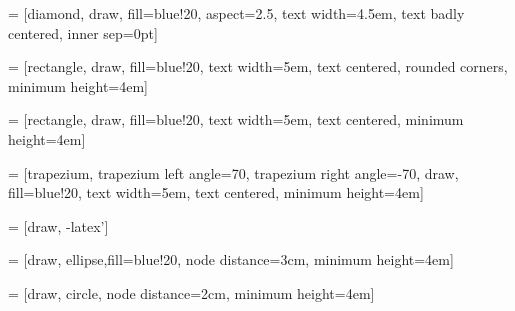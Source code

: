  = [diamond, draw, fill=blue!20, aspect=2.5, 
    text width=4.5em, text badly centered, inner sep=0pt]
    
 = [rectangle, draw, fill=blue!20, text width=5em, text centered, 
    rounded corners, minimum height=4em]
    
 = [rectangle, draw, fill=blue!20, 
    text width=5em, text centered, minimum height=4em]
          
 = [trapezium, trapezium left angle=70, trapezium right angle=-70, draw, fill=blue!20, 
    text width=5em, text centered, minimum height=4em]
    
 = [draw, -latex']

 = [draw, ellipse,fill=blue!20, node distance=3cm,
    minimum height=4em]
    
 = [draw, circle, node distance=2cm, minimum height=4em]
    
